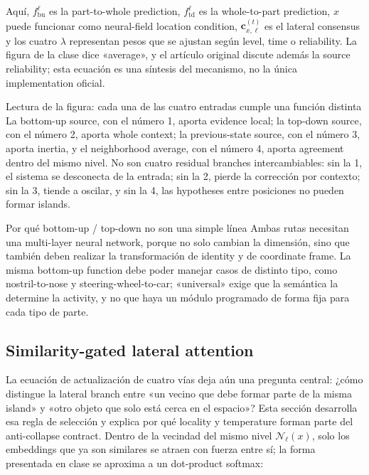 Aquí, $f_{\mathrm{bu}}^{\ell}$ es la part-to-whole prediction, $f_{\mathrm{td}}^{\ell}$ es la whole-to-part prediction, $x$ puede funcionar como neural-field location condition, $\mathbf c_{x,\ell}^{(t)}$ es el lateral consensus y los cuatro $\lambda$ representan pesos que se ajustan según level, time o reliability. La figura de la clase dice «average», y el artículo original discute además la source reliability; esta ecuación es una síntesis del mecanismo, no la única implementation oficial.


\begin{knowledgebox}{Lectura de la figura: cada una de las cuatro entradas cumple una función distinta}
La bottom-up source, con el número 1, aporta evidence local; la top-down source, con el número 2, aporta whole context; la previous-state source, con el número 3, aporta inertia, y el neighborhood average, con el número 4, aporta agreement dentro del mismo nivel. No son cuatro residual branches intercambiables: sin la 1, el sistema se desconecta de la entrada; sin la 2, pierde la corrección por contexto; sin la 3, tiende a oscilar, y sin la 4, las hypotheses entre posiciones no pueden formar islands.
\end{knowledgebox}

\begin{importantbox}{Por qué bottom-up / top-down no son una simple línea}
Ambas rutas necesitan una multi-layer neural network, porque no solo cambian la dimensión, sino que también deben realizar la transformación de identity y de coordinate frame. La misma bottom-up function debe poder manejar casos de distinto tipo, como nostril-to-nose y steering-wheel-to-car; «universal» exige que la semántica la determine la activity, y no que haya un módulo programado de forma fija para cada tipo de parte.
\end{importantbox}

\subsection{Similarity-gated lateral attention}

La ecuación de actualización de cuatro vías deja aún una pregunta central: ¿cómo distingue la lateral branch entre «un vecino que debe formar parte de la misma island» y «otro objeto que solo está cerca en el espacio»? Esta sección desarrolla esa regla de selección y explica por qué locality y temperature forman parte del anti-collapse contract. Dentro de la vecindad del mismo nivel $\mathcal N_\ell(x)$, solo los embeddings que ya son similares se atraen con fuerza entre sí; la forma presentada en clase se aproxima a un dot-product softmax:

